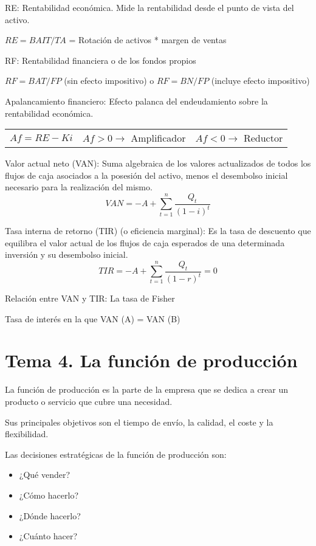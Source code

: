 \documentclass[12pt, twoside, openright]{report} %
\begin{document}
RE: Rentabilidad económica. Mide la rentabilidad desde el punto de vista del activo.

$RE = BAIT / TA$ = Rotación de activos * margen de ventas

RF: Rentabilidad financiera o de los fondos propios

$RF = BAT / FP$ (sin efecto impositivo) o $RF = BN / FP$ (incluye efecto impositivo)

Apalancamiento financiero: Efecto palanca del endeudamiento sobre la rentabilidad económica.
\begin{table}[H]
	\begin{tabular}{lll}
		$Af = RE - Ki$ & $Af > 0 \rightarrow$ Amplificador & $Af < 0 \rightarrow$ Reductor
	\end{tabular}
\end{table}


Valor actual neto (VAN): Suma algebraica de los valores actualizados de todos los flujos de caja asociados a la posesión del activo, menos el desembolso inicial necesario para la realización del mismo.
$$VAN = -A + \sum\limits_{t=1}^n \frac{Q_t}{(1-i)^t}$$

Tasa interna de retorno (TIR) (o eficiencia marginal): Es la tasa de descuento que equilibra el valor actual de los flujos de caja esperados de una determinada inversión y su desembolso inicial.
$$TIR = -A + \sum\limits_{t=1}^n \frac{Q_t}{(1-r)^t}=0$$

Relación entre VAN y TIR: La tasa de Fisher

Tasa de interés en la que VAN (A) = VAN (B)



\chapter{Tema 4. La función de producción}
La función de producción es la parte de la empresa que se dedica a crear un producto o servicio que cubre una necesidad.

Sus principales objetivos son el tiempo de envío, la calidad, el coste y la flexibilidad.

Las decisiones estratégicas de la función de producción son:
\begin{itemize}
	\item ¿Qué vender?
	\item ¿Cómo hacerlo?
	\item ¿Dónde hacerlo?
	\item ¿Cuánto hacer?
\end{itemize}
\end{document}
